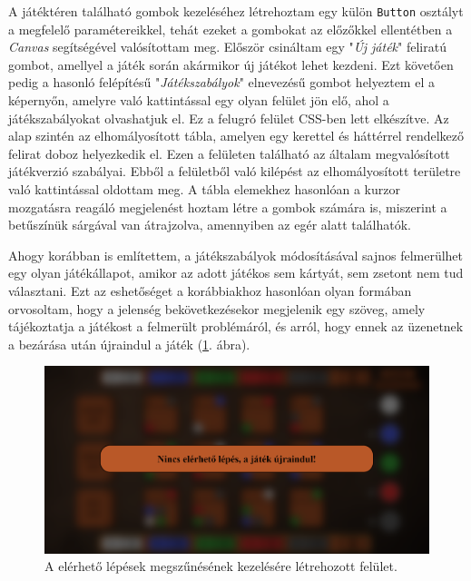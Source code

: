 
A játéktéren található gombok kezeléséhez létrehoztam egy külön \texttt{Button} osztályt a megfelelő paramétereikkel, tehát ezeket a gombokat az előzőkkel ellentétben a \textit{Canvas} segítségével valósítottam meg. Először csináltam egy "\textit{Új játék}" feliratú gombot, amellyel a játék során akármikor új játékot lehet kezdeni. Ezt követően pedig a hasonló felépítésű "\textit{Játékszabályok}" elnevezésű gombot helyeztem el a képernyőn, amelyre való kattintással egy olyan felület jön elő, ahol a játékszabályokat olvashatjuk el. Ez a felugró felület CSS-ben lett elkészítve. Az alap szintén az elhomályosított tábla, amelyen egy kerettel és háttérrel rendelkező felirat doboz helyezkedik el. Ezen a felületen található az általam megvalósított játékverzió szabályai. Ebből a felületből való kilépést az elhomályosított területre való kattintással oldottam meg. A tábla elemekhez hasonlóan a kurzor mozgatásra reagáló megjelenést hoztam létre a gombok számára is, miszerint a betűszínük sárgával van átrajzolva, amennyiben az egér alatt találhatók.



Ahogy korábban is említettem, a játékszabályok módosításával sajnos felmerülhet egy olyan játékállapot, amikor az adott játékos sem kártyát, sem zsetont nem tud választani. Ezt az eshetőséget a korábbiakhoz hasonlóan olyan formában orvosoltam, hogy a jelenség bekövetkezésekor megjelenik egy szöveg, amely tájékoztatja a játékost a felmerült problémáról, és arról, hogy ennek az üzenetnek a bezárása után újraindul a játék (\ref{fig:impossible_action}. ábra).

\begin{figure}[h!]
\centering
\includegraphics[width=\textwidth]{images/impossible_action.png}
\caption{A elérhető lépések megszűnésének kezelésére létrehozott felület.}
\label{fig:impossible_action}
\end{figure}


